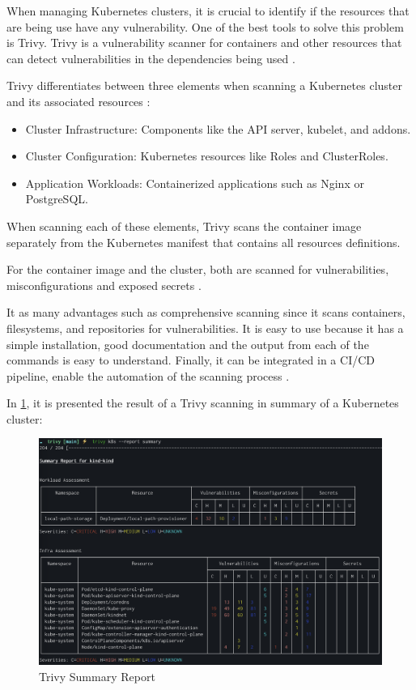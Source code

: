 \documentclass[a4paper,11pt,openright,BCOR=15mm]{scrbook}
\begin{document}
When managing Kubernetes clusters, it is crucial to identify if the resources that are being use have any vulnerability. One of the best tools to solve this problem is Trivy. Trivy is a vulnerability scanner for containers and other resources that can detect vulnerabilities in the dependencies being used \cite{benhassan_deep_2024}.

Trivy differentiates between three elements when scanning a Kubernetes cluster and its associated resources \cite{trivy_doc_kubernetes_nodate}:

\begin{itemize}
	\item Cluster Infrastructure: Components like the API server, kubelet, and addons.
	\item Cluster Configuration: Kubernetes resources like Roles and ClusterRoles.
	\item Application Workloads: Containerized applications such as Nginx or PostgreSQL.
\end{itemize}

When scanning each of these elements, Trivy scans the container image separately from the Kubernetes manifest that contains all resources definitions.

For the container image and the cluster, both are scanned for vulnerabilities, misconfigurations and exposed secrets \cite{trivy_doc_kubernetes_nodate}.

It as many advantages such as comprehensive scanning since it scans containers, filesystems, and repositories for vulnerabilities. It is easy to use because it has a simple installation, good documentation and the output from each of the commands is easy to understand. Finally, it can be integrated in a CI/CD pipeline, enable the automation of the scanning process \cite{benhassan_deep_2024}.

In \ref{fig:trivyResult}, it is presented the result of a Trivy scanning in summary of a Kubernetes cluster:

\begin{figure}[h!]
	\centering
	\label{fig:trivyResult}
	\includegraphics[scale=0.3]{figs/trivy-summary-output.png}
	\caption{Trivy Summary Report \cite{trivy_doc_kubernetes_nodate}}
\end{figure}
\end{document}

